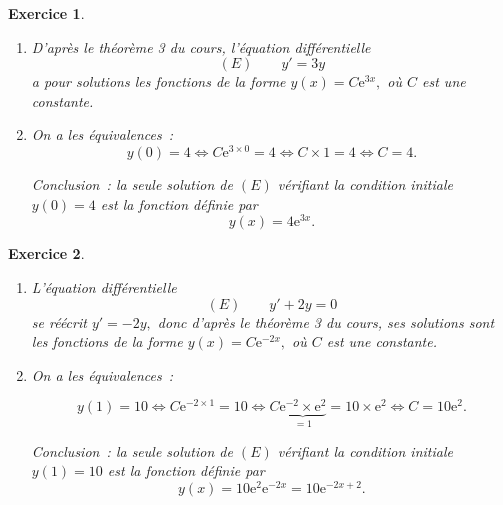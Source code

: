 \documentclass[10pt]{article}
\newtheorem{exo}{Exercice}
\begin{document}
\begin{exo}

\begin{enumerate}
\item D'après le théorème 3 du cours, l'équation différentielle \[(E)\qquad y'=3y\] a pour solutions les fonctions de la forme $y(x)=C\text{e}^{3x},$ où $C$ est une constante.
\item On a les équivalences~:
\[y(0)=4\iff C\text{e}^{3\times 0}=4\iff C\times 1=4\iff C=4.\]

\medskip

Conclusion~: la seule solution de $(E)$ vérifiant la condition initiale $y(0)=4$ est la fonction définie par
\[y(x)=4\text{e}^{3x}.\]
\end{enumerate}

\end{exo}
\begin{exo}

\begin{enumerate}
\item L'équation différentielle \[(E)\qquad y'+2y=0\] se réécrit $y'=-2y,$ donc d'après le théorème 3 du cours, ses solutions sont les fonctions de la forme $y(x)=C\text{e}^{-2x},$ où $C$ est une constante.
\item On a les équivalences~:

\[y(1)=10\iff C\text{e}^{-2\times 1}=10\iff C\underbrace{\text{e}^{-2}\times\text{e}^{2}}_{=1}=10\times\text{e}^{2}\iff C=10\text{e}^{2}.\]

Conclusion~: la seule solution de $(E)$ vérifiant la condition initiale $y(1)=10$ est la fonction définie par
\[y(x)=10\text{e}^{2}\text{e}^{-2x}=10\text{e}^{-2x+2}.\]
\end{enumerate}

\end{exo}
\end{document}
